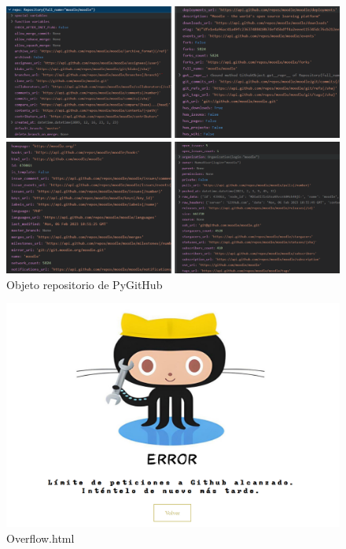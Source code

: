 \documentclass[a4paper, 12pt]{book}
\begin{document}
\begin{figure}
    \centering
    \includegraphics[bb=0 0 800 600, width=12cm, keepaspectratio]{img/objeto_repositorio.png}
    \caption{Objeto repositorio de PyGitHub}\label{fig:Objeto repositorio de PyGitHub}
\end{figure}
\begin{figure}
    \centering
    \includegraphics[bb=0 0 800 600, width=12cm, keepaspectratio]{img/overflow.png}
    \caption{Overflow.html}\label{fig:error overflow}
\end{figure}
\end{document}
